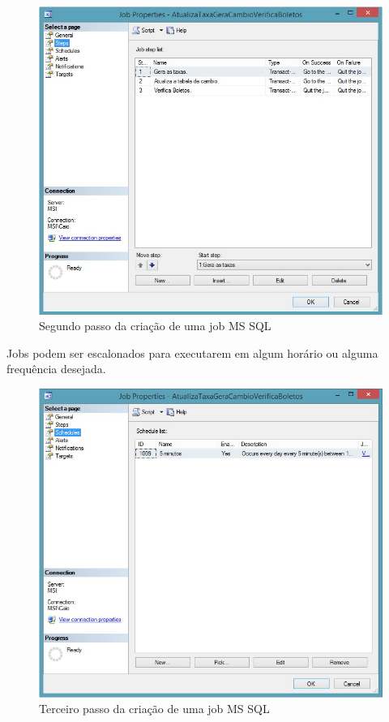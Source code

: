 \documentclass[conference]{IEEEtran}
\begin{document}
    \begin{figure}[!t]
      \centering
  	  \includegraphics[scale=0.45]{img/job2.jpg}
      \caption{Segundo passo da criação de uma job MS SQL}
    \end{figure}

  	Jobs podem ser escalonados para executarem em algum horário ou alguma frequência desejada.

    \begin{figure}[!t]
      \centering
  	  \includegraphics[scale=0.45]{img/job3.jpg}
      \caption{Terceiro passo da criação de uma job MS SQL}
    \end{figure}
\end{document}
